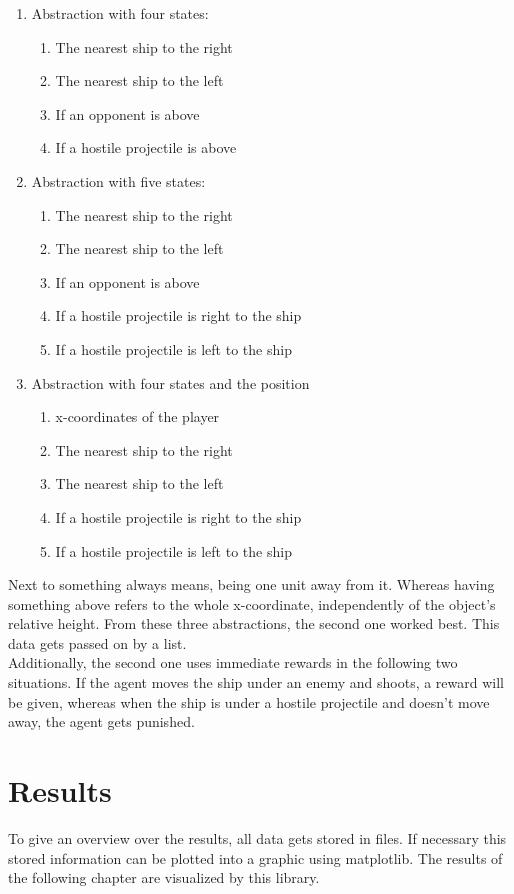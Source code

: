 \documentclass[12pt]{article}
\begin{document}
\begin{enumerate}
    \item Abstraction with four states:
    \begin{enumerate}
        \item The nearest ship to the right
        \item The nearest ship to the left
        \item If an opponent is above
        \item If a hostile projectile is above
    \end{enumerate}
    \item Abstraction with five states:
        \begin{enumerate}
        \item The nearest ship to the right
        \item The nearest ship to the left
        \item If an opponent is above
        \item If a hostile projectile is right to the ship
        \item If a hostile projectile is left to the ship
    \end{enumerate}
    \item Abstraction with four states and the position
        \begin{enumerate}
        \item x-coordinates of the player
        \item The nearest ship to the right
        \item The nearest ship to the left
        \item If a hostile projectile is right to the ship
        \item If a hostile projectile is left to the ship
    \end{enumerate}
\end{enumerate}
Next to something always means, being one unit away from it. Whereas having something above refers to the whole x-coordinate, independently of the object's relative height. From these three abstractions, the second one worked best. This data gets passed on by a list. \\
Additionally, the second one uses immediate rewards in the following two situations. If the agent moves the ship under an enemy and shoots, a reward will be given, whereas when the ship is under a hostile projectile and doesn't move away, the agent gets punished.

\section{Results}\label{sec:results}
To give an overview over the results, all data gets stored in files. If necessary this stored information can be plotted into a graphic using \gls{matplotlib}. The results of the following chapter are visualized by this library.
\end{document}

